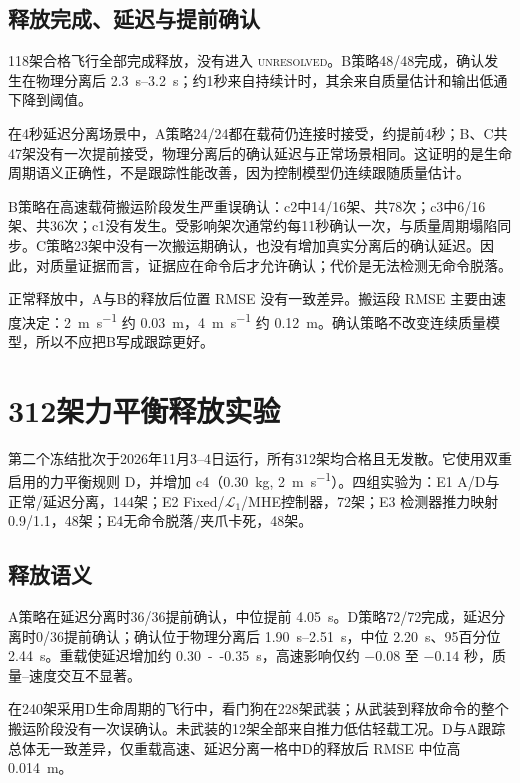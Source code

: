 \documentclass[11pt,UTF8,fontset=none]{ctexrep}
\begin{document}
\subsection{释放完成、延迟与提前确认}

118架合格飞行全部完成释放，没有进入 \textsc{unresolved}。B策略48/48完成，确认发生在物理分离后 \SIrange{2.3}{3.2}{\second}；约1秒来自持续计时，其余来自质量估计和输出低通下降到阈值。

在4秒延迟分离场景中，A策略24/24都在载荷仍连接时接受，约提前4秒；B、C共47架没有一次提前接受，物理分离后的确认延迟与正常场景相同。这证明的是生命周期语义正确性，不是跟踪性能改善，因为控制模型仍连续跟随质量估计。

B策略在高速载荷搬运阶段发生严重误确认：c2中14/16架、共78次；c3中6/16架、共36次；c1没有发生。受影响架次通常约每11秒确认一次，与质量周期塌陷同步。C策略23架中没有一次搬运期确认，也没有增加真实分离后的确认延迟。因此，对质量证据而言，证据应在命令后才允许确认；代价是无法检测无命令脱落。

正常释放中，A与B的释放后位置 RMSE 没有一致差异。搬运段 RMSE 主要由速度决定：\SI{2}{\meter\per\second} 约 \SI{0.03}{\meter}，\SI{4}{\meter\per\second} 约 \SI{0.12}{\meter}。确认策略不改变连续质量模型，所以不应把B写成跟踪更好。

\section{312架力平衡释放实验}

第二个冻结批次于2026年11月3--4日运行，所有312架均合格且无发散。它使用双重启用的力平衡规则 D，并增加 c4（\SI{0.30}{\kg}, \SI{2}{\meter\per\second}）。四组实验为：E1 A/D与正常/延迟分离，144架；E2 Fixed/$\mathcal L_1$/MHE控制器，72架；E3 检测器推力映射0.9/1.1，48架；E4无命令脱落/夹爪卡死，48架。

\subsection{释放语义}

A策略在延迟分离时36/36提前确认，中位提前 \SI{4.05}{\second}。D策略72/72完成，延迟分离时0/36提前确认；确认位于物理分离后 \SIrange{1.90}{2.51}{\second}，中位 \SI{2.20}{\second}、95百分位 \SI{2.44}{\second}。重载使延迟增加约 \SI{0.30}{--}\SI{0.35}{\second}，高速影响仅约 $-0.08$ 至 $-0.14$ 秒，质量--速度交互不显著。

在240架采用D生命周期的飞行中，看门狗在228架武装；从武装到释放命令的整个搬运阶段没有一次误确认。未武装的12架全部来自推力低估轻载工况。D与A跟踪总体无一致差异，仅重载高速、延迟分离一格中D的释放后 RMSE 中位高 \SI{0.014}{\meter}。
\end{document}
